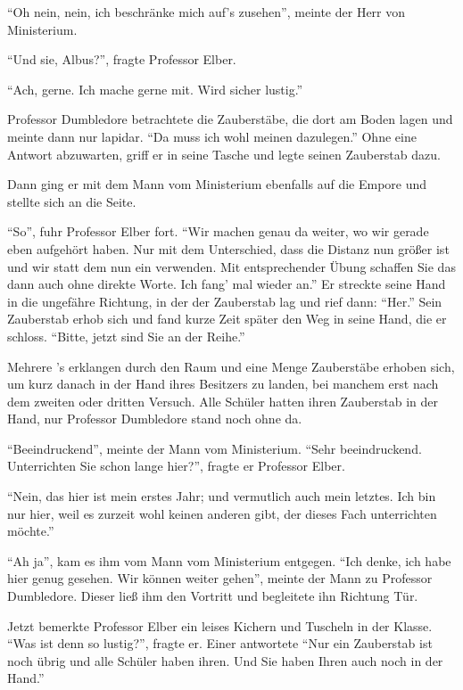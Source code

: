 \enquote{Oh nein, nein, ich beschränke mich auf’s zusehen}, meinte der Herr von Ministerium.

\enquote{Und sie, Albus?}, fragte Professor Elber.

\enquote{Ach, gerne. Ich mache gerne mit. Wird sicher lustig.}

Professor Dumbledore betrachtete die Zauberstäbe, die dort am Boden lagen und meinte dann nur lapidar. \enquote{Da muss ich wohl meinen dazulegen.} Ohne eine Antwort abzuwarten, griff er in seine Tasche und legte seinen Zauberstab dazu.

Dann ging er mit dem Mann vom Ministerium ebenfalls auf die Empore und stellte sich an die Seite.

\enquote{So}, fuhr Professor Elber fort. \enquote{Wir machen genau da weiter, wo wir gerade eben aufgehört haben. Nur mit dem Unterschied, dass die Distanz nun größer ist und wir statt dem  nun ein  verwenden. Mit entsprechender Übung schaffen Sie das dann auch ohne direkte Worte. Ich fang’ mal wieder an.} Er streckte seine Hand in die ungefähre Richtung, in der der Zauberstab lag und rief dann: \enquote{Her.} Sein Zauberstab erhob sich und fand kurze Zeit später den Weg in seine Hand, die er schloss. \enquote{Bitte, jetzt sind Sie an der Reihe.}

Mehrere ’s erklangen durch den Raum und eine Menge Zauberstäbe erhoben sich, um kurz danach in der Hand ihres Besitzers zu landen, bei manchem erst nach dem zweiten oder dritten Versuch. Alle Schüler hatten ihren Zauberstab in der Hand, nur Professor Dumbledore stand noch ohne da.

\enquote{Beeindruckend}, meinte der Mann vom Ministerium. \enquote{Sehr beeindruckend. Unterrichten Sie schon lange hier?}, fragte er Professor Elber.

\enquote{Nein, das hier ist mein erstes Jahr; und vermutlich auch mein letztes. Ich bin nur hier, weil es zurzeit wohl keinen anderen gibt, der dieses Fach unterrichten möchte.}

\enquote{Ah ja}, kam es ihm vom Mann vom Ministerium entgegen. \enquote{Ich denke, ich habe hier genug gesehen. Wir können weiter gehen}, meinte der Mann zu Professor Dumbledore. Dieser ließ ihm den Vortritt und begleitete ihn Richtung Tür.

Jetzt bemerkte Professor Elber ein leises Kichern und Tuscheln in der Klasse. \enquote{Was ist denn so lustig?}, fragte er. Einer antwortete \enquote{Nur ein Zauberstab ist noch übrig und alle Schüler haben ihren. Und Sie haben Ihren auch noch in der Hand.}

